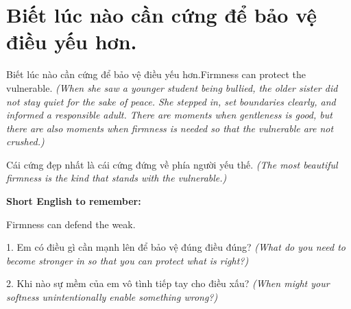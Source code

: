 \section{Biết lúc nào cần cứng để bảo vệ điều yếu hơn.}
\begin{truyen}{Biết lúc nào cần cứng để bảo vệ điều yếu hơn.}{Firmness can protect the vulnerable.}
\textit{(When she saw a younger student being bullied, the older sister did not stay quiet for the sake of peace. She stepped in, set boundaries clearly, and informed a responsible adult. There are moments when gentleness is good, but there are also moments when firmness is needed so that the vulnerable are not crushed.)}
\end{truyen}
\begin{baihoc}
Cái cứng đẹp nhất là cái cứng đứng về phía người yếu thế.
\textit{(The most beautiful firmness is the kind that stands with the vulnerable.)}
\end{baihoc}
\begin{ghinhoanh}
\textbf{Short English to remember:}

Firmness can defend the weak.
\end{ghinhoanh}
\begin{tuhocnhanh}
1. Em có điều gì cần mạnh lên để bảo vệ đúng điều đúng? \textit{(What do you need to become stronger in so that you can protect what is right?)}

2. Khi nào sự mềm của em vô tình tiếp tay cho điều xấu? \textit{(When might your softness unintentionally enable something wrong?)}
\end{tuhocnhanh}
\ngancach
